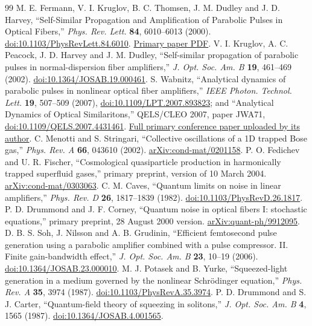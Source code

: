 \documentclass[11pt,a4paper]{article}
\newcommand{\doi}[1]{\href{https://doi.org/#1}{doi:#1}}
\begin{document}
\begin{thebibliography}{99}
\small
{} M. E. Fermann, V. I. Kruglov, B. C. Thomsen, J. M. Dudley and J. D. Harvey, ``Self-Similar Propagation and Amplification of Parabolic Pulses in Optical Fibers,'' \emph{Phys. Rev. Lett.} \textbf{84}, 6010--6013 (2000). \doi{10.1103/PhysRevLett.84.6010}. \href{https://discovery.ucl.ac.uk/97897/1/97897.pdf}{Primary paper PDF}.
 V. I. Kruglov, A. C. Peacock, J. D. Harvey and J. M. Dudley, ``Self-similar propagation of parabolic pulses in normal-dispersion fiber amplifiers,'' \emph{J. Opt. Soc. Am. B} \textbf{19}, 461--469 (2002). \doi{10.1364/JOSAB.19.000461}.
 S. Wabnitz, ``Analytical dynamics of parabolic pulses in nonlinear optical fiber amplifiers,'' \emph{IEEE Photon. Technol. Lett.} \textbf{19}, 507--509 (2007), \doi{10.1109/LPT.2007.893823}; and ``Analytical Dynamics of Optical Similaritons,'' QELS/CLEO 2007, paper JWA71, \doi{10.1109/QELS.2007.4431461}. \href{https://www.researchgate.net/publication/238087766_Analytical_Dynamics_of_Optical_Similaritons}{Full primary conference paper uploaded by its author}.
 C. Menotti and S. Stringari, ``Collective oscillations of a 1D trapped Bose gas,'' \emph{Phys. Rev. A} \textbf{66}, 043610 (2002). \href{https://arxiv.org/abs/cond-mat/0201158}{arXiv:cond-mat/0201158}.
 P. O. Fedichev and U. R. Fischer, ``Cosmological quasiparticle production in harmonically trapped superfluid gases,'' primary preprint, version of 10 March 2004. \href{https://arxiv.org/abs/cond-mat/0303063}{arXiv:cond-mat/0303063}.
 C. M. Caves, ``Quantum limits on noise in linear amplifiers,'' \emph{Phys. Rev. D} \textbf{26}, 1817--1839 (1982). \doi{10.1103/PhysRevD.26.1817}.
 P. D. Drummond and J. F. Corney, ``Quantum noise in optical fibers I: stochastic equations,'' primary preprint, 28 August 2000 version. \href{https://arxiv.org/abs/quant-ph/9912095}{arXiv:quant-ph/9912095}.
 D. B. S. Soh, J. Nilsson and A. B. Grudinin, ``Efficient femtosecond pulse generation using a parabolic amplifier combined with a pulse compressor. II. Finite gain-bandwidth effect,'' \emph{J. Opt. Soc. Am. B} \textbf{23}, 10--19 (2006). \doi{10.1364/JOSAB.23.000010}.
 M. J. Potasek and B. Yurke, ``Squeezed-light generation in a medium governed by the nonlinear Schr\"odinger equation,'' \emph{Phys. Rev. A} \textbf{35}, 3974 (1987). \doi{10.1103/PhysRevA.35.3974}.
 P. D. Drummond and S. J. Carter, ``Quantum-field theory of squeezing in solitons,'' \emph{J. Opt. Soc. Am. B} \textbf{4}, 1565 (1987). \doi{10.1364/JOSAB.4.001565}.

\end{thebibliography}
\end{document}
